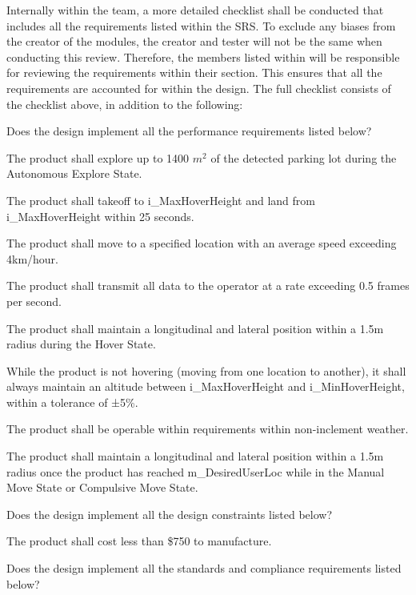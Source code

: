 \documentclass[12pt, titlepage]{article}
\begin{document}
Internally within the team, a more detailed checklist shall be conducted that includes all the requirements listed within the SRS. To exclude any biases from the creator of the modules, the creator and tester will not be the same when conducting this review. Therefore, the members listed within \label{VnV_Team} will be responsible for reviewing the requirements within their section. This ensures that all the requirements are accounted for within the design. The full checklist consists of the checklist above, in addition to the following: 

\begin{todolist}
\label{Design2_Checklist}
\item Does the design implement all the performance requirements listed below?
\begin{todolist}
    \item The product shall explore up to 1400 $m^2$ of the detected parking lot during the Autonomous Explore State.
    \item The product shall takeoff to i\_MaxHoverHeight and land from i\_MaxHoverHeight within 25 seconds.
    \item The product shall move to a specified location with an average speed exceeding 4km/hour.
    \item The product shall transmit all data to the operator at a rate exceeding 0.5 frames per second.
    \item The product shall maintain a longitudinal and lateral position within a 1.5m radius during the Hover State.
    \item While the product is not hovering (moving from one location to another), it shall always maintain an altitude between i\_MaxHoverHeight and i\_MinHoverHeight, within a tolerance of ±5\%.
    \item The product shall be operable within requirements within non-inclement weather.
    \item The product shall maintain a longitudinal and lateral position within a 1.5m radius once the product has reached m\_DesiredUserLoc while in the Manual Move State or Compulsive Move State.
\end{todolist}
\item Does the design implement all the design constraints listed below?
\begin{todolist}
    \item The product shall cost less than \$750 to manufacture.
\end{todolist}
\item Does the design implement all the standards and compliance requirements listed below?

\end{todolist}
\end{document}
